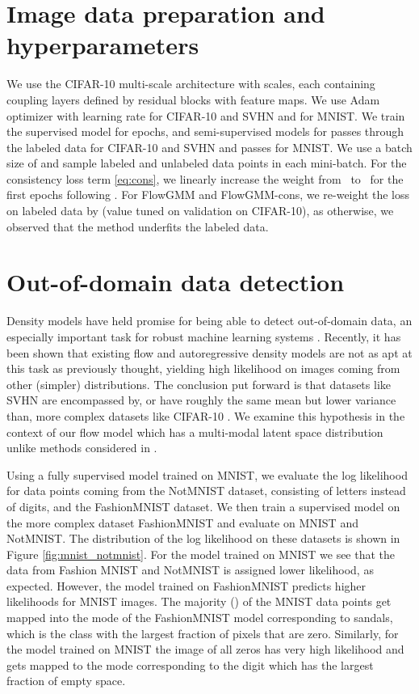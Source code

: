 \documentclass{article}
\newcommand{\method}{FlowGMM\xspace}
\newcommand{\methodcons}{FlowGMM-cons\xspace}
\begin{document}
\section{Image data preparation and hyperparameters}\label{sec:imageexptsdetails}
We use the CIFAR-10
multi-scale architecture with  scales, each containing  coupling layers
defined by  residual blocks with  feature maps. We use Adam optimizer
\citep{kingma2014adam} with learning rate  for CIFAR-10 and SVHN
and  for MNIST. We train the supervised model for  epochs,
and semi-supervised models for  passes through the labeled data for CIFAR-10 and SVHN and  passes for MNIST. We use a batch
size of  and sample  labeled and  unlabeled data points in each 
mini-batch.
For the consistency
loss term \eqref{eq:cons}, we linearly increase the weight from~ to~
for the first  epochs following \citet{athiwaratkun2018there}. For \method and \methodcons, we re-weight the loss on labeled data 
by  (value tuned on validation \citep{kingma2014semi} on CIFAR-10), as otherwise, we observed that the method underfits the labeled data. 

\section{Out-of-domain data detection}

Density models have held promise for being able to detect out-of-domain data, an especially important task for robust machine learning systems \citep{nalisnick2019hybrid}. Recently, it has been shown that existing flow and autoregressive density models are not as apt at this task as previously thought, yielding high likelihood on images coming from other (simpler) distributions. The conclusion put forward is that datasets like SVHN are encompassed by, or have roughly the same mean but lower variance than, more complex datasets like CIFAR-10 \citep{nalisnick2018deep}.
We examine this hypothesis in the context of our flow model which has a multi-modal latent space distribution unlike methods considered in \citet{nalisnick2018deep}.
\label{sec:ood}


Using a fully supervised model trained on MNIST, we evaluate the log likelihood for data points coming from the NotMNIST dataset, consisting of letters instead of digits, and the FashionMNIST dataset. We then train a supervised model on the more complex dataset FashionMNIST and evaluate on MNIST and NotMNIST.
The distribution of the log likelihood  on these datasets is shown in Figure \ref{fig:mnist_notmnist}. For the model trained on MNIST we see that the data
from Fashion MNIST and NotMNIST is assigned lower
likelihood, as expected.
However, the model trained on FashionMNIST predicts higher likelihoods for MNIST images. The majority () of the MNIST data points get mapped into the mode of the FashionMNIST model corresponding to sandals, which is the class with the largest fraction of pixels that are zero. 
Similarly, for the model trained on MNIST the image 
of all zeros has very high likelihood and gets mapped to the mode corresponding to the digit  which has 
the largest fraction of empty space.
\end{document}
